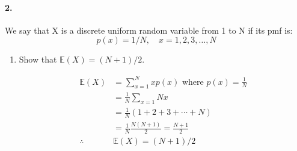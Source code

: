     \pagebreak

    \paragraph*{2.}
    We say that X is a discrete uniform random variable from 1 to N if its pmf is:
    \begin{equation*}
        p(x) = 1/N, \quad x = 1,2,3,\dots,N
    \end{equation*}
    \begin{enumerate}[label=(\alph*)]
        \item Show that $\mathbb{E}(X) = (N+1)/2$.
        \\
        \begin{mdframed}
            \begin{align*}
                \mathbb{E}(X)   & = \sum_{x=1}^{N} xp(x) \text{ where } p(x) = \frac{1}{N}  \\
                                & = \frac{1}{N} \sum_{x=1}{N} x                             \\
                                & = \frac{1}{N} (1 + 2 + 3 + \cdots + N)                    \\
                                & = \frac{1}{N}\frac{N(N+1)}{2} = \frac{N+1}{2}             \\
                \therefore \quad& \mathbb{E}(X) = (N+1)/2
            \end{align*}
        \end{mdframed}


\end{enumerate}
